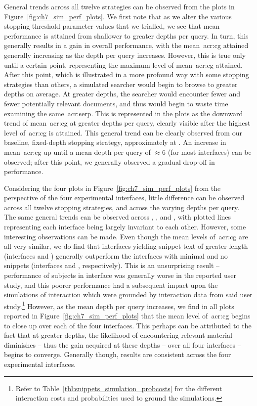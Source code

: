 General trends across all twelve strategies can be observed from the plots in Figure~\ref{fig:ch7_sim_perf_plots}. We first note that as we alter the various stopping threshold parameter values that we trialled, we see that mean performance is attained from shallower to greater depths per query. In turn, this generally results in a gain in overall performance, with the mean~\gls{acr:cg} attained generally increasing as the depth per query increases. However, this is true only until a certain point, representing the maximum level of mean~\gls{acr:cg} attained. After this point, which is illustrated in a more profound way with some stopping strategies than others, a simulated searcher would begin to browse to greater depths on average. At greater depths, the searcher would encounter fewer and fewer potentially relevant documents, and thus would begin to waste time examining the same~\gls{acr:serp}. This is represented in the plots as the downward trend of mean~\gls{acr:cg} at greater depths per query, clearly visible after the highest level of~\gls{acr:cg} is attained. This general trend can be clearly observed from our baseline, fixed-depth stopping strategy, approximately at . An increase in mean~\gls{acr:cg} up until a mean depth per query of $\approx6$ (for most interfaces) can be observed; after this point, we generally observed a gradual drop-off in performance.

Considering the four plots in Figure~\ref{fig:ch7_sim_perf_plots} from the perspective of the four experimental interfaces, little difference can be observed across all twelve stopping strategies, and across the varying depths per query. The same general trends can be observed across , ,  and , with plotted lines representing each interface being largely invariant to each other. However, some interesting observations can be made. Even though the mean levels of~\gls{acr:cg} are all very similar, we do find that interfaces yielding snippet text of greater length (interfaces  and ) generally outperform the interfaces with minimal and no snippets (interfaces  and , respectively). This is an unsurprising result -- performance of subjects in interface  was generally worse in the reported user study, and this poorer performance had a subsequent impact upon the simulations of interaction which were grounded by interaction data from said user study.\footnote{Refer to Table~\ref{tbl:snippets_simulation_probcosts} for the different interaction costs and probabilities used to ground the simulations.} However, as the mean depth per query increases, we find in all plots reported in Figure~\ref{fig:ch7_sim_perf_plots} that the mean level of~\gls{acr:cg} begins to close up over each of the four interfaces. This perhaps can be attributed to the fact that at greater depths, the likelihood of encountering relevant material diminishes -- thus the gain acquired at these depths -- over all four interfaces -- begins to converge. Generally though, results are consistent across the four experimental interfaces.


